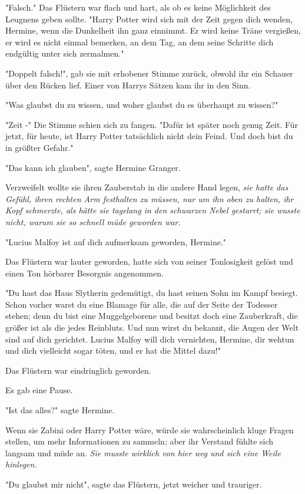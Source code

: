 {"Falsch." Das Flüstern war flach und hart, als ob es keine Möglichkeit des Leugnens geben sollte. "Harry Potter wird sich mit der Zeit gegen dich wenden, Hermine, wenn die Dunkelheit ihn ganz einnimmt. Er wird keine Träne vergießen, er wird es nicht einmal bemerken, an dem Tag, an dem seine Schritte dich endgültig unter sich zermalmen."

"Doppelt falsch!", gab sie mit erhobener Stimme zurück, obwohl ihr ein Schauer über den Rücken lief. Einer von Harrys Sätzen kam ihr in den Sinn.

"Was glaubst du zu wissen, und woher glaubst du es überhaupt zu wissen?"

"Zeit -" Die Stimme schien sich zu fangen. "Dafür ist später noch genug Zeit. Für jetzt, für heute, ist Harry Potter tatsächlich nicht dein Feind. Und doch bist du in größter Gefahr."

"Das kann ich glauben", sagte Hermine Granger.

Verzweifelt wollte sie ihren Zauberstab in die andere Hand legen, \emph{sie hatte das Gefühl, ihren rechten Arm festhalten zu müssen, nur um ihn oben zu halten, ihr Kopf schmerzte, als hätte sie tagelang in den schwarzen Nebel gestarrt; sie wusste nicht, warum sie so schnell müde geworden war.}

"Lucius Malfoy ist auf dich aufmerksam geworden, Hermine."

Das Flüstern war lauter geworden, hatte sich von seiner Tonlosigkeit gelöst und einen Ton hörbarer Besorgnis angenommen.

"Du hast das Haus Slytherin gedemütigt, du hast seinen Sohn im Kampf besiegt. Schon vorher warst du eine Blamage für alle, die auf der Seite der Todesser stehen; denn du bist eine Muggelgeborene und besitzt doch eine Zauberkraft, die größer ist als die jedes Reinbluts. Und nun wirst du bekannt, die Augen der Welt sind auf dich gerichtet. Lucius Malfoy will dich vernichten, Hermine, dir wehtun und dich vielleicht sogar töten, und er hat die Mittel dazu!"

Das Flüstern war eindringlich geworden.

Es gab eine Pause.

"Ist das alles?" sagte Hermine.

Wenn sie Zabini oder Harry Potter wäre, würde sie wahrscheinlich kluge Fragen stellen, um mehr Informationen zu sammeln; aber ihr Verstand fühlte sich langsam und müde an. \emph{Sie musste wirklich von hier weg und sich eine Weile hinlegen.}

"Du glaubst mir nicht", sagte das Flüstern, jetzt weicher und trauriger.

}
